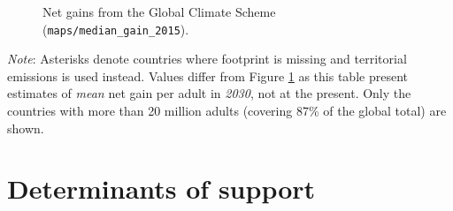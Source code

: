 \begin{figure}[h!]
    \cprotect\caption[Net gains from the Global Climate Scheme]{Net gains from the Global Climate Scheme (\verb|maps/median_gain_2015|).}\label{fig:median_gain_2015}
\end{figure}

\clearpage
{}
    {\footnotesize \textit{Note}: %
    Asterisks denote countries where footprint is missing and territorial emissions is used instead. %
    Values differ from Figure \ref{fig:median_gain_2015} as this table present estimates of \textit{mean} net gain per adult in \textit{2030}, not at the present. Only the countries with more than 20 million adults (covering 87\% of the global total) are shown. 
    }


\clearpage
\section{Determinants of support}\label{app:determinants}

